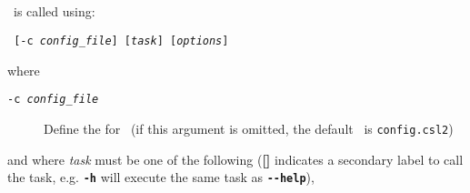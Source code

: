 \subsection{\label{sec:CommandLineArguments}}

\CNAME\ is called using:

\texttt{\cname\ [-c \emph{config\_file}] [\emph{task}] [\emph{options}]}

where

\begin{description}
  \item [\texttt{-c \emph{config\_file}}] Define the \config for \CNAME\ (if this argument is omitted, the default \config\ is \texttt{config.csl2})
\end{description}

and where \emph{task} must be one of the following (\textbf{[]} indicates a secondary label to call the task, e.g. \textbf{\texttt{-h}} will execute the same task as \textbf{\texttt{-{}-help}}),

